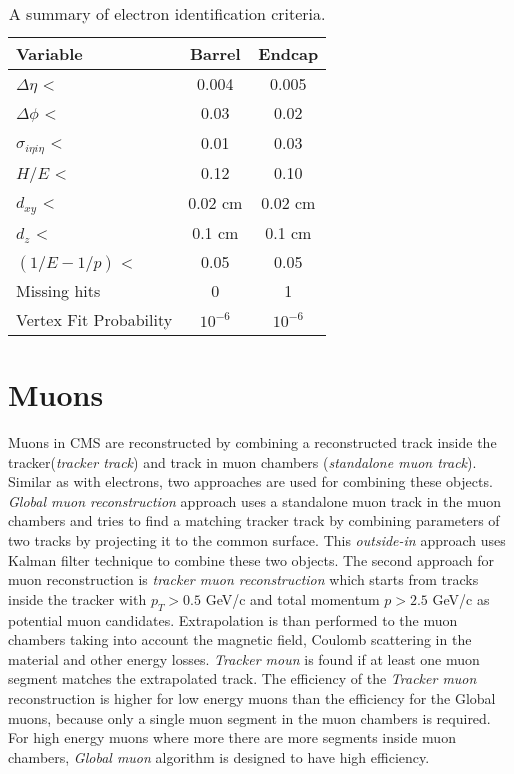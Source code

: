  \begin{table}[h]
\centering
  \caption{A summary of electron identification criteria.}
  \label{tab:eleID}
  \begin{tabular}{ l  c c}
      \hline
      \hline
      	Variable & Barrel & Endcap \\
      	\hline
    		$\Delta\eta$ < &  0.004 & 0.005 \\
     	$\Delta\phi$ < &  0.03 & 0.02 \\
     	$\sigma_{i\eta i\eta}$ < & 0.01 & 0.03 \\
		$H/E$ < & 0.12 & 0.10 \\
		$d_{xy}$ < & 0.02 cm & 0.02 cm \\
		$d_{z}$ <  & 0.1 cm & 0.1 cm \\
		$(1/E - 1/p)$ < & 0.05 & 0.05\\
		Missing hits  & 0 & 1 \\
		Vertex Fit Probability & $10^{-6}$ & $10^{-6}$ \\    	

      \hline
      \hline 
  \end{tabular}
\end{table}



\section{Muons}

Muons in CMS are reconstructed by combining a reconstructed track inside the tracker(\textit{tracker track}) and track in muon chambers (\textit{standalone muon track}). Similar as with electrons, two approaches are used for combining these objects. \textit{Global muon reconstruction} approach uses a standalone muon track in the muon chambers and tries to find a matching tracker track by combining parameters of two tracks by projecting it to the common surface. This \textit{outside-in} approach uses Kalman filter technique \cite{Fruhwirth1987444} to combine these two objects. The second approach for muon reconstruction is \textit{tracker muon reconstruction} which starts from tracks inside the tracker with $p_T>0.5$ GeV/c and total momentum $p>2.5$ GeV/c as potential muon candidates. Extrapolation is than performed to the muon chambers taking into account the magnetic field, Coulomb scattering in the material and other energy losses. \textit{Tracker moun} is found if at least one muon segment matches the extrapolated track. The efficiency of the \textit{Tracker muon} reconstruction is higher for low energy muons than the efficiency for the Global muons, because only a single muon segment in the muon chambers is required. For high energy muons where more there are more segments inside muon chambers, \textit{Global muon} algorithm is designed to have high efficiency.    

